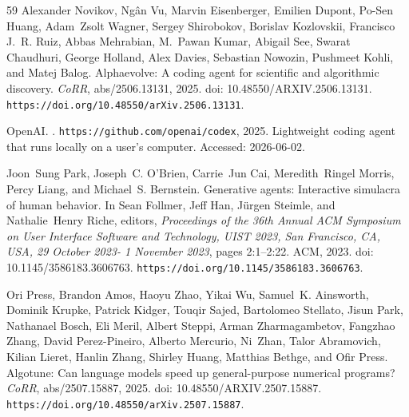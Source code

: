 \documentclass{llmxive}
\providecommand{\url}[1]{\texttt{#1}}
\providecommand{\doi}[1]{doi: #1}
\begin{document}
\begin{thebibliography}{59}
Alexander Novikov, Ng{\^{a}}n Vu, Marvin Eisenberger, Emilien Dupont, Po{-}Sen Huang, Adam~Zsolt Wagner, Sergey Shirobokov, Borislav Kozlovskii, Francisco J.~R. Ruiz, Abbas Mehrabian, M.~Pawan Kumar, Abigail See, Swarat Chaudhuri, George Holland, Alex Davies, Sebastian Nowozin, Pushmeet Kohli, and Matej Balog.
\newblock Alphaevolve: {A} coding agent for scientific and algorithmic discovery.
\newblock \emph{CoRR}, abs/2506.13131, 2025.
\newblock \doi{10.48550/ARXIV.2506.13131}.
\newblock \url{https://doi.org/10.48550/arXiv.2506.13131}.

{OpenAI}.
.
\newblock \url{https://github.com/openai/codex}, 2025.
\newblock Lightweight coding agent that runs locally on a user's computer. Accessed: 2026-06-02.

Joon~Sung Park, Joseph~C. O'Brien, Carrie~Jun Cai, Meredith~Ringel Morris, Percy Liang, and Michael~S. Bernstein.
\newblock Generative agents: Interactive simulacra of human behavior.
\newblock In Sean Follmer, Jeff Han, J{\"{u}}rgen Steimle, and Nathalie~Henry Riche, editors, \emph{Proceedings of the 36th Annual {ACM} Symposium on User Interface Software and Technology, {UIST} 2023, San Francisco, CA, USA, 29 October 2023- 1 November 2023}, pages 2:1--2:22. {ACM}, 2023.
\newblock \doi{10.1145/3586183.3606763}.
\newblock \url{https://doi.org/10.1145/3586183.3606763}.

Ori Press, Brandon Amos, Haoyu Zhao, Yikai Wu, Samuel~K. Ainsworth, Dominik Krupke, Patrick Kidger, Touqir Sajed, Bartolomeo Stellato, Jisun Park, Nathanael Bosch, Eli Meril, Albert Steppi, Arman Zharmagambetov, Fangzhao Zhang, David Perez{-}Pineiro, Alberto Mercurio, Ni~Zhan, Talor Abramovich, Kilian Lieret, Hanlin Zhang, Shirley Huang, Matthias Bethge, and Ofir Press.
\newblock Algotune: Can language models speed up general-purpose numerical programs?
\newblock \emph{CoRR}, abs/2507.15887, 2025.
\newblock \doi{10.48550/ARXIV.2507.15887}.
\newblock \url{https://doi.org/10.48550/arXiv.2507.15887}.


\end{thebibliography}
\end{document}
